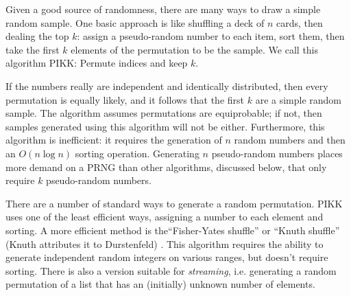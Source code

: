 \documentclass[graybox]{svmult}
\begin{document}
Given a good source of randomness, there are many ways to draw a simple random sample.
One basic approach is like shuffling a deck of $n$ cards, then dealing the top $k$:
assign a pseudo-random number to each item, sort them, then take the first $k$ elements of the permutation to be the sample.
We call this algorithm PIKK: Permute indices and keep $k$.

If the numbers really are independent and identically distributed, then every permutation is equally likely, 
and it follows that the first $k$ are a simple random sample.
The algorithm assumes permutations are equiprobable; if not, then samples generated using this algorithm will not be either.
Furthermore, this algorithm is inefficient: it requires the generation of $n$ random numbers and then an $O(n\log n)$ sorting operation.
Generating $n$ pseudo-random numbers places more demand on a PRNG than other algorithms, discussed below, that only require $k$ pseudo-random numbers.

%

There are a number of standard ways to generate a random permutation.
PIKK uses one of the least efficient ways, assigning a number to each element and sorting.
A more efficient method is the``Fisher-Yates shuffle'' or ``Knuth shuffle'' (Knuth attributes it to Durstenfeld) \cite{knuth_art_1997}.
This algorithm requires the ability to generate independent random integers on various ranges, but doesn't require sorting.
There is also a version suitable for \emph{streaming}, i.e. generating a random permutation of a list that has an (initially) unknown number of elements.
\end{document}
